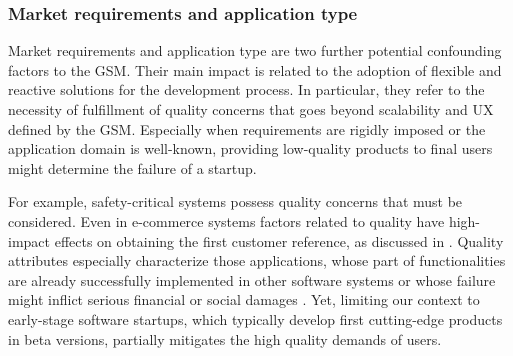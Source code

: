 \documentclass[10pt,journal,letterpaper,compsoc]{IEEEtran}
\begin{document}
\subsubsection{Market requirements and application type} 
Market requirements \cite{Coleman2007} and application type \cite{Sutton2000, 
Coleman2008, Coleman2008a} are two further potential confounding factors to the 
GSM. Their main impact is related to the adoption of flexible and reactive 
solutions for the development process. In particular, they refer to the 
necessity of fulfillment of quality concerns that goes beyond scalability and UX 
defined by the GSM. Especially when requirements are rigidly imposed or the 
application domain is well-known, providing low-quality products to final users 
might determine the failure of a startup. 

For example, safety-critical systems possess quality concerns that must be 
considered. Even in e-commerce systems factors related to quality have 
high-impact effects on obtaining the first customer reference, 
as discussed in \cite{Deakins2005,Kim2005,Silva2005}. Quality attributes  
especially %
characterize those applications, whose part of functionalities are already 
successfully implemented in other software systems or whose failure might 
inflict serious financial or social damages \cite{Bass2003}. Yet, limiting our 
context to early-stage software startups, which typically develop first 
cutting-edge products in beta versions, partially mitigates the high quality 
demands of users.
\end{document}
